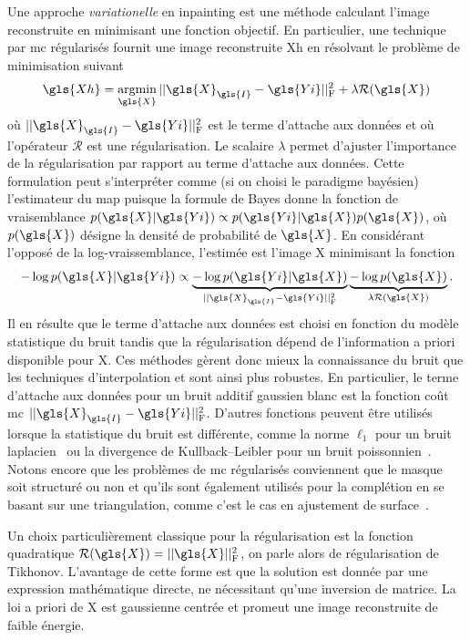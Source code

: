 Une approche \emph{variationelle} en inpainting est une méthode calculant l'image reconstruite en minimisant une fonction objectif. En particulier, une technique par \gls{mc} régularisés fournit une image reconstruite \gls{Xh} en résolvant le problème de minimisation suivant~\cite[Section~6.3]{boyd2004convex}
\begin{equation}\label{eq-MC-regul}
    \gls{Xh} = \argmin_{\gls{X}} \frobnorm{\gls{X}_{\gls{I}} - \gls{Yi}} + \lambda \mathcal{R}(\gls{X})
\end{equation}
où $\frobnorm{\gls{X}_{\gls{I}} - \gls{Yi}}$ est le terme d'attache aux données et où l'opérateur $\mathcal{R}$ est une régularisation. Le scalaire $\lambda$ permet d'ajuster l'importance de la régularisation par rapport au terme d'attache aux données. Cette formulation peut s'interpréter comme (si on choisi le paradigme bayésien) l'estimateur du \gls{map} puisque la formule de Bayes donne la fonction de vraisemblance $p(\gls{X}|\gls{Yi}) \propto p(\gls{Yi}|\gls{X}) p(\gls{X})$, où $p(\gls{X})$ désigne la densité de probabilité de $\gls{X}$. En considérant l'opposé de la log-vraissemblance, l'estimée est l'image \gls{X} minimisant la fonction
\begin{equation}
    -\log p(\gls{X}|\gls{Yi}) \propto
    \underbrace{-\log p(\gls{Yi}|\gls{X})}_{\frobnorm{\gls{X}_{\gls{I}} - \gls{Yi}}}
    \underbrace{- \log p(\gls{X})}_{\lambda\mathcal{R}(\gls{X})}.
\end{equation}
Il en résulte que le terme d'attache aux données est choisi en fonction du modèle statistique du bruit tandis que la régularisation dépend de l'information a priori disponible pour \gls{X}. Ces méthodes gèrent donc mieux la connaissance du bruit que les techniques d'interpolation et sont ainsi plus robustes. En particulier, le terme d'attache aux données pour un bruit additif gaussien blanc est la fonction coût \gls{mc} $\frobnorm{\gls{X}_{\gls{I}} - \gls{Yi}}$. D'autres fonctions peuvent être utilisés lorsque la statistique du bruit est différente, comme la norme $\ell_1$ pour un bruit laplacien~\cite{frecon2017bayesian} ou la divergence de Kullback–Leibler pour un bruit poissonnien~\cite{ono2013poisson}. Notons encore que les problèmes de \gls{mc} régularisés conviennent que le masque soit structuré ou non et qu'ils sont également utilisés pour la complétion en se basant sur une triangulation, comme c'est le cas en ajustement de surface~\cite{zhong2016surface,cazals2006delaunay}.

Un choix particulièrement classique pour la régularisation est la fonction quadratique $\mathcal{R}(\gls{X}) = \frobnorm{\gls{X}}$, on parle alors de régularisation de Tikhonov. L'avantage de cette forme est que la solution est  donnée par une expression mathématique directe, ne nécessitant qu'une inversion de matrice. La loi a priori de \gls{X} est gaussienne centrée et promeut une image reconstruite de faible énergie.

